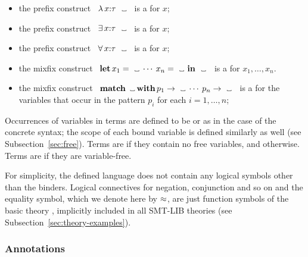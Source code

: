 \begin{itemize}
\item
the prefix construct
\ $\lambda\,x{:}\tau\ \vartextvisiblespace$ \ is 
a 
for $x$;

\item
the prefix construct
\ $\exists\,x{:}\tau\ \vartextvisiblespace$ \ is 
a 
for $x$;

\item
the prefix construct
\ $\forall\,x{:}\tau\ \vartextvisiblespace$ \ is 
a 
for $x$;

\item
the mixfix construct
\ $\akey{let}\,x_1 = \vartextvisiblespace\:\cdots\:x_n = \vartextvisiblespace\ \akey{in}\ \vartextvisiblespace$ \ is 
a 
for $x_1, \ldots, x_n$.

\item
the mixfix construct 
\ $\akey{match}\,\vartextvisiblespace\,\akey{with}\,p_1 \to \vartextvisiblespace\:\cdots\:p_n \to \vartextvisiblespace$ \ is 
a  for the variables that occur in the pattern $p_i$ for each $i=1,\ldots,n$;

\end{itemize}

Occurrences of variables in terms are defined to be  or
 as in the case of the concrete syntax;
the scope of each bound variable is defined similarly as well
(see Subsection~\ref{sec:free}).
Terms are  
if they contain no free variables, and  otherwise.
Terms are  if they are variable-free.

For simplicity,
the defined language does not contain any logical symbols
other than the binders.
Logical connectives for negation, conjunction and so on 
and the equality symbol, which we denote here by $\approx$,
are just function symbols of the basic theory ,
implicitly included in all SMT-LIB theories
(see Subsection~\ref{sec:theory-examples}). 

\subsubsection{Annotations}

